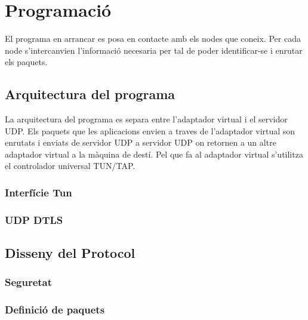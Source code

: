 \chapter{Programació}
El programa en arrancar es posa en contacte amb els nodes que coneix. Per cada node s'intercanvien l'informació necesaria per tal de poder identificar-se i enrutar els paquets.
\section{Arquitectura del programa}
La arquitectura del programa es separa entre l'adaptador virtual i el servidor UDP. Els paquets que les aplicacions envien a traves de l'adaptador virtual son enrutats i enviats de servidor UDP a servidor UDP on retornen a un altre adaptador virtual a la màquina de destí.
Pel que fa al adaptador virtual s'utilitza el controlador universal TUN/TAP.
\subsection{Interfície Tun}

\subsection{UDP DTLS}

\section{Disseny del Protocol}
\subsection{Seguretat}
\subsection{Definició de paquets}
